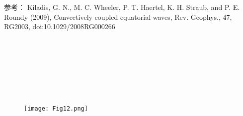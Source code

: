 \documentclass{article}
\begin{document}
\begin{CJK*}{UTF8}{gbsn}
参考：
Kiladis, G. N., M. C. Wheeler, P. T. Haertel, K. H. Straub, and P. E. Roundy (2009), Convectively coupled equatorial waves, Rev. Geophys., 47, RG2003, doi:10.1029/2008RG000266 



\ 






\ 






\ 





\ 

\begin{figure}
    \centering
    \texttt{[image: Fig12.png]}

\end{figure}


\ 




\ 




\ 




\ 




\ 




\ 




\ 




\ 




\ 




\ 




\ 




\ 




\ 




\ 




\ 




\ 




\ 




\ 




\ 





\end{CJK*}
\end{document}
